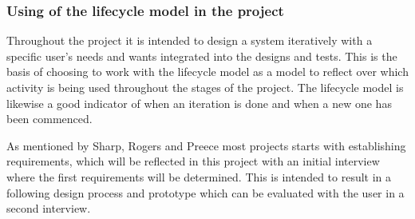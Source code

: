 \subsubsection{Using of the lifecycle model in the project}
Throughout the project it is intended to design a system iteratively with a specific user’s needs and wants integrated into the designs and tests. This is the basis of choosing to work with the lifecycle model as a model to reflect over which activity is being used throughout the stages of the project. The lifecycle model is likewise a good indicator of when an iteration is done and when a new one has been commenced. 

As mentioned by Sharp, Rogers and Preece most projects starts with establishing requirements, which will be reflected in this project with an initial interview where the first requirements will be determined. This is intended to result in a following design process and prototype which can be evaluated with the user in a second interview.

